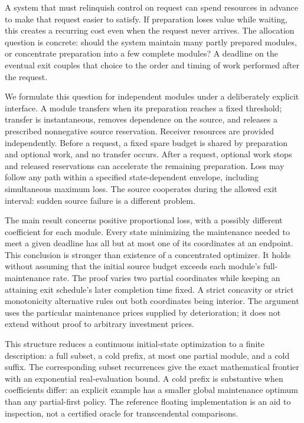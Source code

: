 \documentclass[11pt]{article}
\theoremstyle{remark}
\begin{document}
A system that must relinquish control on request can spend resources in
advance to make that request easier to satisfy. If preparation loses value
while waiting, this creates a recurring cost even when the request never
arrives. The allocation question is concrete: should the system maintain
many partly prepared modules, or concentrate preparation into a few complete
modules? A deadline on the eventual exit couples that choice to the order
and timing of work performed after the request.

We formulate this question for independent modules under a deliberately
explicit interface. A module transfers when its preparation reaches a fixed
threshold; transfer is instantaneous, removes dependence on the source, and
releases a prescribed nonnegative source reservation. Receiver resources are
provided independently. Before a request, a fixed spare budget is shared by
preparation and optional work, and no transfer occurs. After a request,
optional work stops and released reservations can accelerate the remaining
preparation. Loss may follow any path within a specified state-dependent
envelope, including simultaneous maximum loss. The source cooperates during
the allowed exit interval: sudden source failure is a different problem.

The main result concerns positive proportional loss, with a possibly
different coefficient for each module. Every state minimizing the
maintenance needed to meet a given deadline has all but at most one of its
coordinates at an endpoint. This conclusion is stronger than existence of a
concentrated optimizer. It holds without assuming that the initial source
budget exceeds each module's full-maintenance rate. The proof varies two
partial coordinates while keeping an attaining exit schedule's later
completion time fixed. A strict concavity or strict monotonicity alternative
rules out both coordinates being interior. The argument uses the particular
maintenance prices supplied by deterioration; it does not extend without
proof to arbitrary investment prices.

This structure reduces a continuous initial-state optimization to a finite
description: a full subset, a cold prefix, at most one partial module, and a
cold suffix. The corresponding subset recurrences give the exact mathematical
frontier with an exponential real-evaluation bound. A cold prefix is
substantive when coefficients differ: an explicit example has a smaller
global maintenance optimum than any partial-first policy. The reference
floating implementation is an aid to inspection, not a certified oracle
for transcendental comparisons.
\end{document}
